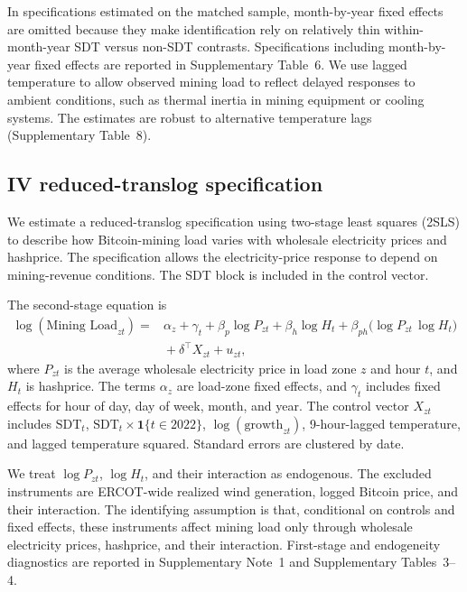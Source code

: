 \documentclass[pdflatex,sn-mathphys-num]{sn-jnl}%
\theoremstyle{thmstyleone}%
\theoremstyle{thmstyletwo}%
\theoremstyle{thmstylethree}%
\begin{document}
In specifications estimated on the matched sample, month-by-year fixed effects are omitted because they make identification rely on relatively thin within-month-year SDT versus non-SDT contrasts. Specifications including month-by-year fixed effects are reported in Supplementary Table~6. We use lagged temperature to allow observed mining load to reflect delayed responses to ambient conditions, such as thermal inertia in mining equipment or cooling systems. The estimates are robust to alternative temperature lags (Supplementary Table~8).

\subsection*{IV reduced-translog specification}

We estimate a reduced-translog specification using two-stage least squares (2SLS) to describe how Bitcoin-mining load varies with wholesale electricity prices and hashprice. The specification allows the electricity-price response to depend on mining-revenue conditions. The SDT block is included in the control vector.

The second-stage equation is
\begin{equation}
\label{eq:second_stage_translog}
\begin{aligned}
\log(\text{Mining Load}_{zt})
= {} & \alpha_z + \gamma_t
+ \beta_p \log P_{zt}
+ \beta_h \log H_t
+ \beta_{ph}\big(\log P_{zt}\,\log H_t\big) \\
& {} + \delta^\top X_{zt}
+ u_{zt},
\end{aligned}
\end{equation}
where $P_{zt}$ is the average wholesale electricity price in load zone $z$ and hour $t$, and $H_t$ is hashprice. The terms $\alpha_z$ are load-zone fixed effects, and $\gamma_t$ includes fixed effects for hour of day, day of week, month, and year. The control vector $X_{zt}$ includes $\text{SDT}_{t}$, $\text{SDT}_{t}\times \mathbf{1}\{t\in 2022\}$, $\log(\text{growth}_{zt})$, 9-hour-lagged temperature, and lagged temperature squared. Standard errors are clustered by date.

We treat $\log P_{zt}$, $\log H_t$, and their interaction as endogenous. The excluded instruments are ERCOT-wide realized wind generation, logged Bitcoin price, and their interaction. The identifying assumption is that, conditional on controls and fixed effects, these instruments affect mining load only through wholesale electricity prices, hashprice, and their interaction. First-stage and endogeneity diagnostics are reported in Supplementary Note~1 and Supplementary Tables~3--4.
\end{document}
